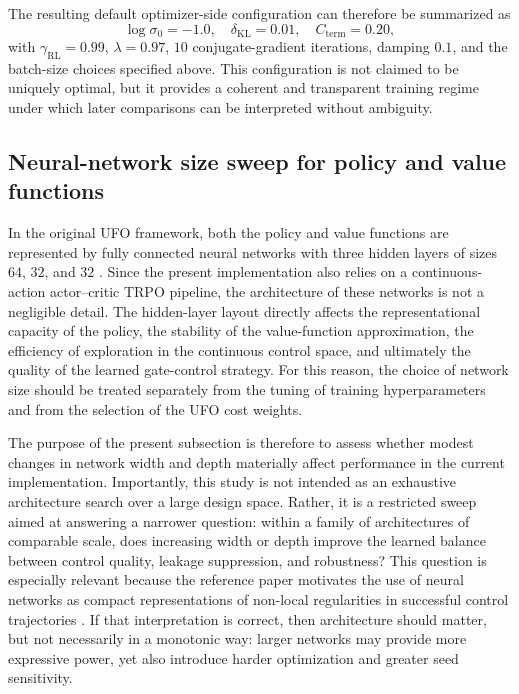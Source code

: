 The resulting default optimizer-side configuration can therefore be summarized as
\begin{equation}
\log \sigma_0 = -1.0,\quad
\delta_{\mathrm{KL}} = 0.01,\quad
C_{\mathrm{term}}=0.20,
\label{eq:default_training_configuration_summary_revised}
\end{equation}
with \(\gamma_{\mathrm{RL}}=0.99\), \(\lambda=0.97\), \(10\) conjugate-gradient iterations, damping \(0.1\), and the batch-size choices specified above. This configuration is not claimed to be uniquely optimal, but it provides a coherent and transparent training regime under which later comparisons can be interpreted without ambiguity.



\subsection{Neural-network size sweep for policy and value functions}
\label{subsec:nn_size_sweep}

In the original UFO framework, both the policy and value functions are represented by fully connected neural networks with three hidden layers of sizes \(64\), \(32\), and \(32\) \cite{Niu2019}. Since the present implementation also relies on a continuous-action actor--critic TRPO pipeline, the architecture of these networks is not a negligible detail. The hidden-layer layout directly affects the representational capacity of the policy, the stability of the value-function approximation, the efficiency of exploration in the continuous control space, and ultimately the quality of the learned gate-control strategy. For this reason, the choice of network size should be treated separately from the tuning of training hyperparameters and from the selection of the UFO cost weights.

The purpose of the present subsection is therefore to assess whether modest changes in network width and depth materially affect performance in the current implementation. Importantly, this study is not intended as an exhaustive architecture search over a large design space. Rather, it is a restricted sweep aimed at answering a narrower question: within a family of architectures of comparable scale, does increasing width or depth improve the learned balance between control quality, leakage suppression, and robustness? This question is especially relevant because the reference paper motivates the use of neural networks as compact representations of non-local regularities in successful control trajectories \cite{Niu2019}. If that interpretation is correct, then architecture should matter, but not necessarily in a monotonic way: larger networks may provide more expressive power, yet also introduce harder optimization and greater seed sensitivity.

